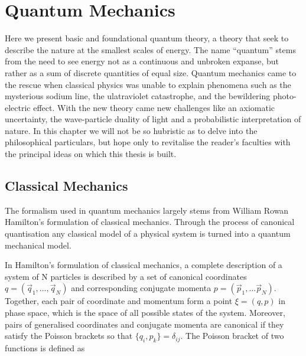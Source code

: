 \chapter{Quantum Mechanics}

    Here we present basic and foundational quantum theory, a theory that seek to 
    describe the nature at the smallest scales of energy. The name ``quantum'' stems 
    from the need to see energy not as a continuous and unbroken expanse, but rather 
    as a sum of discrete quantities of equal size. Quantum mechanics came to the 
    rescue when classical physics was unable to explain phenomena such as the mysterious 
    sodium line, the ulatraviolet catastrophe, and the bewildering photo-electric effect.
    With the new theory came new challenges like an axiomatic uncertainty, 
    the wave-particle duality of light and a 
    probabilistic interpretation of nature. In this chapter we will not be so hubristic 
    as to delve into the philosophical particulars, but hope only to revitalise the 
    reader's faculties with the principal ideas on which this thesis is built.

\section{Classical Mechanics}

    The formalism used in quantum mechanics largely stems from William Rowan Hamilton's 
    formulation of classical mechanics. Through the process of canonical
    quantisation any classical model of a physical system is turned into
    a quantum mechanical model.

    In Hamilton's formulation of classical mechanics, a complete description of a system
    of N particles is described by a set of canonical coordinates 
    $q = (\vec{q}_1, \dots, \vec{q}_N)$ and corresponding conjugate momenta
    $p = (\vec{p}_1, \dots \vec{p}_N)$. Together, each pair of coordinate and momentum
    form a point $\xi = (q, p)$ in phase space, which is the space of all possible states
    of the system. Moreover, pairs of generalised coordinates and conjugate
    momenta are canonical if they satisfy the Poisson brackets so that 
    $\{q_i, p_k\} = \delta_{ij}$. The Poisson bracket of two functions is defined as 

